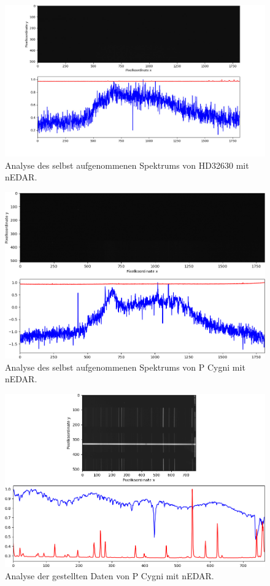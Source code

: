 \begin{figure}[h]
  \centering
  \resizebox{.5\textwidth}{!}{}
  \caption{} \label{fig:pcSi3}
\end{figure}
\begin{figure}[t]
  \centering
  \includegraphics[width=.5\textwidth]{HD32630_beob.jpeg}
  \caption{Analyse des selbst aufgenommenen Spektrums von HD32630 mit nEDAR.} \label{fig:beob_hd32630}
\end{figure}
\begin{figure}[t]
  \centering
  \includegraphics[width=.5\textwidth]{eigenes_spektrum_pcygni.png}
  \caption{Analyse des selbst aufgenommenen Spektrums von P Cygni mit nEDAR.} \label{fig:beob_pcygni}
\end{figure}
\begin{figure}[t]
  \centering
  \includegraphics[width=.5\textwidth]{gestellter_stern_hd109358.png}
  \caption{Analyse der gestellten Daten von P Cygni mit nEDAR.} \label{fig:bereit_pcygni}
\end{figure}
